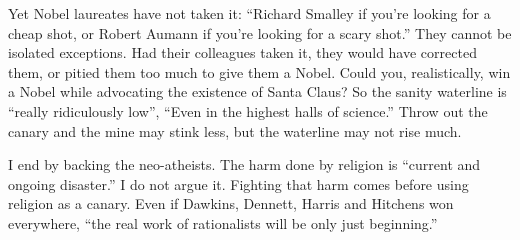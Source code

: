 Yet Nobel laureates have not taken it: ``Richard Smalley if you're looking for a cheap shot, or Robert Aumann if you're looking for a scary shot.'' They cannot be isolated exceptions. Had their colleagues taken it, they would have corrected them, or pitied them too much to give them a Nobel. Could you, realistically, win a Nobel while advocating the existence of Santa Claus?  So the sanity waterline is ``really ridiculously low'', ``Even in the highest halls of science.'' Throw out the canary and the mine may stink less, but the waterline may not rise much.

I end by backing the neo-atheists. The harm done by religion is ``current and ongoing disaster.'' I do not argue it. Fighting that harm comes before using religion as a canary. Even if Dawkins, Dennett, Harris and Hitchens won everywhere, ``the real work of rationalists will be only just beginning.''
